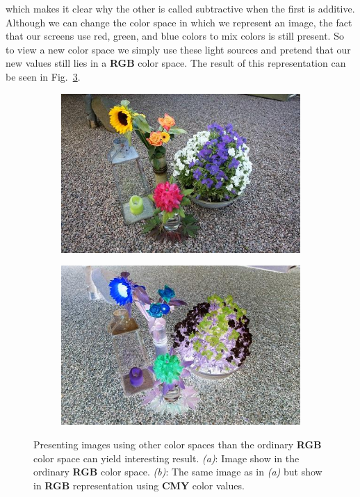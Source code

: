 which makes it clear why the other is called subtractive when the first is additive. Although we can change the color space in which we represent an image, the fact that our screens use red, green, and blue colors to mix colors is still present. So to view a new color space we simply use these light sources and pretend that our new values still lies in a \textbf{RGB} color space. The result of this representation can be seen in Fig.~\ref{fig:rgbTocmy}.

\begin{figure}[H]
    \centering
    \captionsetup[subfigure]{justification=centering}
    \begin{subfigure}[b]{0.49\textwidth}
        \centering
        \includegraphics[width=\textwidth]{./figure/appendix/color_rep/images/imgRGB.jpg}
		\caption{}
		\label{fig:imgRGB}
    \end{subfigure}
    \begin{subfigure}[b]{0.49\textwidth}
        \centering
        \includegraphics[width=\textwidth]{./figure/appendix/color_rep/images/imgCMY.jpg}
		\caption{}
		\label{fig:imgCMY}
    \end{subfigure}
    \caption{Presenting images using other color spaces than the ordinary \textbf{RGB} color space can yield interesting result. \textit{(a)}: Image show in the ordinary \textbf{RGB} color space. \textit{(b)}: The same image as in \textit{(a)} but show in \textbf{RGB} representation using \textbf{CMY} color values.}
    \label{fig:rgbTocmy}
\end{figure}

